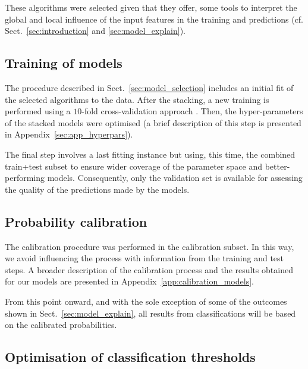 \documentclass{aa}
\begin{document}
These algorithms were selected given that they offer, some tools to interpret the global and local influence of the input features in the training and predictions (cf. Sect.~\ref{sec:introduction} and \ref{sec:model_explain}).%

\subsection{Training of models}\label{sec:models_training}

The procedure described in Sect.~\ref{sec:model_selection} includes an initial fit of the selected algorithms to the data. After the stacking, a new training is performed using a $10$-fold cross-validation approach \citep[e.g.][]{https://doi.org/10.1111/j.2517-6161.1974.tb00994.x, doi:10.1080/00401706.1974.10489157}. Then, the hyper-parameters of the stacked models were optimised (a brief description of this step is presented in Appendix~\ref{sec:app_hyperpars}).

The final step involves a last fitting instance but using, this time, the combined train+test subset to ensure wider coverage of the parameter space and better-performing models. Consequently, only the validation set is available for assessing the quality of the predictions made by the models.

\subsection{Probability calibration}\label{sec:prob_calibration}

The calibration procedure was performed in the calibration subset. In this way, we avoid influencing the process with information from the training and test steps. A broader description of the calibration process and the results obtained for our models are presented in Appendix~\ref{app:calibration_models}.

From this point onward, and with the sole exception of some of the outcomes shown in Sect.~\ref{sec:model_explain}, all results from classifications will be based on the calibrated probabilities.

\subsection{Optimisation of classification thresholds}\label{sec:threshold_opt}
\end{document}
